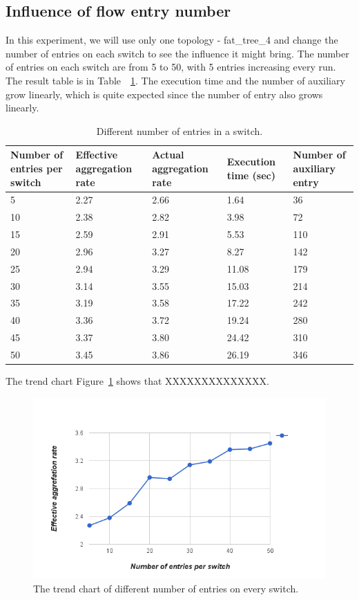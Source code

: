 \subsection{Influence of flow entry number}
In this experiment, we will use only one topology - fat\_tree\_4 and change the number of entries on each switch to see the influence it might bring. The number of entries on each switch are from 5 to 50, with 5 entries increasing every run. The result table is in Table~~\ref{table:different_entry_per_switch}. The execution time and the number of auxiliary grow linearly, which is quite expected since the number of entry also grows linearly.

\begin{table}
\centering
\caption{Different number of entries in a switch.}
\begin{tabular}{|l||l|l|l|l|}
\hline Number of entries per switch & Effective aggregation rate & Actual aggregation rate & Execution time (sec) & Number of auxiliary entry \\
\hline
\hline 5 & 2.27 & 2.66 & 1.64 & 36 \\
\hline 10 & 2.38 & 2.82 & 3.98 & 72 \\
\hline 15 & 2.59 & 2.91 & 5.53 & 110 \\
\hline 20 & 2.96 & 3.27 & 8.27 & 142 \\
\hline 25 & 2.94 & 3.29 & 11.08 & 179 \\
\hline 30 & 3.14 & 3.55 & 15.03 & 214 \\
\hline 35 & 3.19 & 3.58 & 17.22 & 242 \\
\hline 40 & 3.36 & 3.72 & 19.24 & 280 \\
\hline 45 & 3.37 & 3.80 & 24.42 & 310 \\
\hline 50 & 3.45 & 3.86 & 26.19 & 346 \\
\hline
\end{tabular}
\label{table:different_entry_per_switch}
\end{table}

The trend chart Figure~\ref{exp_entrynum_trend} shows that XXXXXXXXXXXXXX. 

\begin{figure}[H]
\begin{center} 
\includegraphics[width=1\textwidth]{figures/exp_entrynum_trend.png}
\end{center}
\caption{The trend chart of different number of entries on every switch.}
\label{exp_entrynum_trend}
\end{figure}

